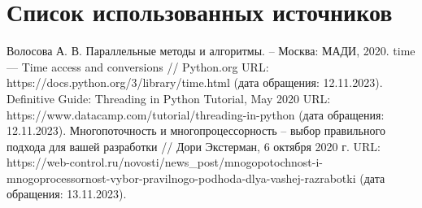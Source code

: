 \chapter*{Список использованных источников}

\begin{enumerate}[label = {[\arabic*]}]
	 Волосова А. В. Параллельные методы и алгоритмы. -- Москва: МАДИ, 2020.
	 time — Time access and conversions // Python.org URL: \newline https://docs.python.org/3/library/time.html (дата обращения: 12.11.2023).
	 Definitive Guide: Threading in Python Tutorial, May 2020 URL: \newline
	https://www.datacamp.com/tutorial/threading-in-python (дата обращения: 12.11.2023).
	 Многопоточность и многопроцессорность -- выбор правильного подхода для вашей разработки // Дори Экстерман, 6 октября 2020 г. URL: \newline
	https://web-control.ru/novosti/news\_post/mnogopotochnost-i-mnogoprocessornost-vybor-pravilnogo-podhoda-dlya-vashej-razrabotki (дата обращения: 13.11.2023).
	\label{lib:proc}
\end{enumerate}
